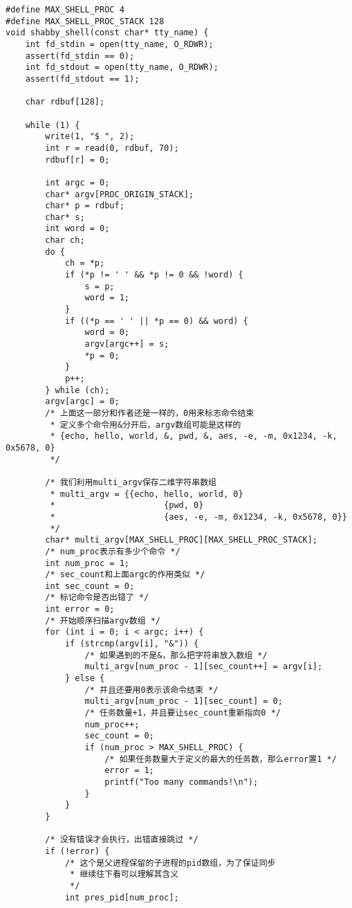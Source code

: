 \documentclass{whureport}
\begin{document}
\begin{lstlisting}
#define MAX_SHELL_PROC 4
#define MAX_SHELL_PROC_STACK 128
void shabby_shell(const char* tty_name) {
    int fd_stdin = open(tty_name, O_RDWR);
    assert(fd_stdin == 0);
    int fd_stdout = open(tty_name, O_RDWR);
    assert(fd_stdout == 1);

    char rdbuf[128];

    while (1) {
        write(1, "$ ", 2);
        int r = read(0, rdbuf, 70);
        rdbuf[r] = 0;

        int argc = 0;
        char* argv[PROC_ORIGIN_STACK];
        char* p = rdbuf;
        char* s;
        int word = 0;
        char ch;
        do {
            ch = *p;
            if (*p != ' ' && *p != 0 && !word) {
                s = p;
                word = 1;
            }
            if ((*p == ' ' || *p == 0) && word) {
                word = 0;
                argv[argc++] = s;
                *p = 0;
            }
            p++;
        } while (ch);
        argv[argc] = 0;
        /* 上面这一部分和作者还是一样的，0用来标志命令结束
         * 定义多个命令用&分开后，argv数组可能是这样的
         * {echo, hello, world, &, pwd, &, aes, -e, -m, 0x1234, -k, 0x5678, 0}
         */

		/* 我们利用multi_argv保存二维字符串数组
		 * multi_argv = {{echo, hello, world, 0}
		 *				 		{pwd, 0}
		 *				 		{aes, -e, -m, 0x1234, -k, 0x5678, 0}}
		 */
        char* multi_argv[MAX_SHELL_PROC][MAX_SHELL_PROC_STACK];
        /* num_proc表示有多少个命令 */
        int num_proc = 1;
        /* sec_count和上面argc的作用类似 */
        int sec_count = 0;
        /* 标记命令是否出错了 */
        int error = 0;
        /* 开始顺序扫描argv数组 */
        for (int i = 0; i < argc; i++) {
            if (strcmp(argv[i], "&")) {
            	/* 如果遇到的不是&，那么把字符串放入数组 */
                multi_argv[num_proc - 1][sec_count++] = argv[i];
            } else {
           		/* 并且还要用0表示该命令结束 */
                multi_argv[num_proc - 1][sec_count] = 0;
                /* 任务数量+1，并且要让sec_count重新指向0 */
                num_proc++;
                sec_count = 0;
                if (num_proc > MAX_SHELL_PROC) {
                	/* 如果任务数量大于定义的最大的任务数，那么error置1 */
                    error = 1;
                    printf("Too many commands!\n");
                }
            }
        }

		/* 没有错误才会执行，出错直接跳过 */
        if (!error) {
        	/* 这个是父进程保留的子进程的pid数组，为了保证同步
        	 * 继续往下看可以理解其含义
        	 */
            int pres_pid[num_proc];
			

\end{lstlisting}
\end{document}
